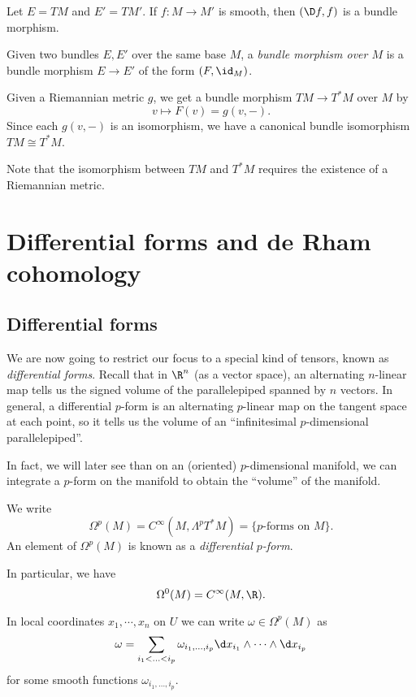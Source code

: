 \documentclass[a4paper]{article}
\begin{document}
\begin{eg}
  Let $E = TM$ and $E' = TM'$. If $f: M \to M'$ is smooth, then $(\D f, f)$ is a bundle morphism.
\end{eg}

\begin{defi}
  Given two bundles $E, E'$ over the same base $M$, a \emph{bundle morphism over $M$} is a bundle morphism $E \to E'$ of the form $(F, \id_M)$.
\end{defi}

\begin{eg}
  Given a Riemannian metric $g$, we get a bundle morphism $TM \to T^*M$ over $M$ by
  \[
    v \mapsto F(v) = g(v, -).
  \]
  Since each $g(v, -)$ is an isomorphism, we have a canonical bundle isomorphism $TM \cong T^*M$.
\end{eg}
Note that the isomorphism between $TM$ and $T^*M$ requires the existence of a Riemannian metric.

\section{Differential forms and de Rham cohomology}
\subsection{Differential forms}
We are now going to restrict our focus to a special kind of tensors, known as \emph{differential forms}. Recall that in $\R^n$ (as a vector space), an alternating $n$-linear map tells us the signed volume of the parallelepiped spanned by $n$ vectors. In general, a differential $p$-form is an alternating $p$-linear map on the tangent space at each point, so it tells us the volume of an ``infinitesimal $p$-dimensional parallelepiped''.

In fact, we will later see than on an (oriented) $p$-dimensional manifold, we can integrate a $p$-form on the manifold to obtain the ``volume'' of the manifold.

\begin{defi}
  We write
  \[
    \Omega^p (M) = C^\infty(M, \Lambda^p T^*M) = \{\text{$p$-forms on $M$}\}.
  \]
  An element of $\Omega^p(M)$ is known as a \emph{differential $p$-form}.

  In particular, we have
  \[
    \Omega^0(M) = C^\infty(M, \R).
  \]
\end{defi}
In local coordinates $x_1, \cdots, x_n$ on $U$ we can write $\omega \in \Omega^p(M)$ as
\[
  \omega = \sum_{i_1 < \ldots < i_p} \omega_{i_1, \ldots, i_p} \d x_{i_1} \wedge \cdots \wedge \d x_{i_p}
\]
for some smooth functions $\omega_{i_1, \ldots, i_p}$.
\end{document}
